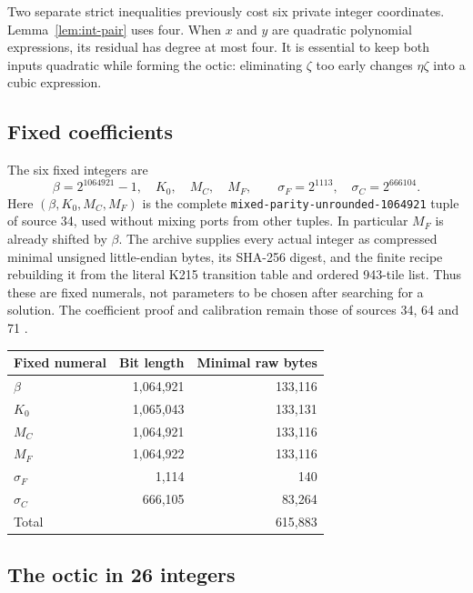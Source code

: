 Two separate strict inequalities previously cost six private integer
coordinates.  Lemma~\ref{lem:int-pair} uses four.  When $x$ and $y$ are
quadratic polynomial expressions, its residual has degree at most four.
It is essential to keep both inputs quadratic while forming the octic:
eliminating $\zeta$ too early changes $\eta\zeta$ into a cubic expression.

\subsection{Fixed coefficients}

The six fixed integers are
\[
 \beta=2^{1064921}-1,\quad K_0,\quad M_C,\quad M_F,
 \qquad \sigma_F=2^{1113},\quad \sigma_C=2^{666104}.
\]
Here $(\beta,K_0,M_C,M_F)$ is the complete
\texttt{mixed-parity-unrounded-1064921} tuple of source 34, used without
mixing ports from other tuples.  In particular $M_F$ is already shifted
by $\beta$.  The archive supplies every actual integer as compressed
minimal unsigned little-endian bytes, its SHA-256 digest, and the finite
recipe rebuilding it from the literal K215 transition table and ordered
943-tile list.  Thus these are fixed numerals, not parameters to be chosen
after searching for a solution.  The coefficient proof and calibration
remain those of sources 34, 64 and 71 \cite{source64,source71}.

\begin{center}
\begin{tabular}{lrr}
\hline
Fixed numeral & Bit length & Minimal raw bytes\\
\hline
$\beta$ & 1,064,921 & 133,116\\
$K_0$ & 1,065,043 & 133,131\\
$M_C$ & 1,064,921 & 133,116\\
$M_F$ & 1,064,922 & 133,116\\
$\sigma_F$ & 1,114 & 140\\
$\sigma_C$ & 666,105 & 83,264\\
\hline
Total & & 615,883\\
\hline
\end{tabular}
\end{center}

\subsection{The octic in 26 integers}

